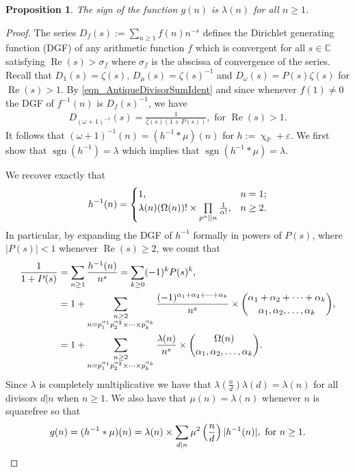 \documentclass[11pt,reqno,a4letter]{article}
\numberwithin{equation}{section}
\numberwithin{figure}{section}
\numberwithin{table}{section}
\newcommand{\cf}{\textit{cf.\ }}
\renewcommand{\chi}{\upchi}
\theoremstyle{plain}
\newtheorem{prop}[theorem]{Proposition}
\numberwithin{theorem}{section}
\theoremstyle{definition}
\renewcommand{\Re}{\operatorname{Re}}
\begin{document}
\begin{prop}
\label{prop_SignageDirInvsOfPosBddArithmeticFuncs_v1} 
The sign of the function $g(n)$ is $\lambda(n)$ for all $n \geq 1$. 
\end{prop} 
\begin{proof} 
The series $D_f(s) := \sum_{n \geq 1} f(n) n^{-s}$ defines the 
Dirichlet generating function (DGF) of any 
arithmetic function $f$ which is convergent for all $s \in \mathbb{C}$ satisfying 
$\Re(s) > \sigma_f$ where $\sigma_f$ is the abscissa of convergence of the series. 
Recall that $D_{\mathds{1}}(s) = \zeta(s)$, $D_{\mu}(s) = \zeta(s)^{-1}$ and 
$D_{\omega}(s) = P(s) \zeta(s)$ for $\Re(s) > 1$. 
By \eqref{eqn_AntiqueDivisorSumIdent} and since whenever $f(1) \neq 0$ 
the DGF of $f^{-1}(n)$ is $D_f(s)^{-1}$, we have 
\begin{align} 
\label{eqn_DGF_of_gInvn} 
D_{(\omega+1)^{-1}}(s) = \frac{1}{\zeta(s) (1+P(s))}, \text{ for } \Re(s) > 1. 
\end{align} 
It follows that $(\omega + 1)^{-1}(n) = (h^{-1} \ast \mu)(n)$ for 
$h := \chi_{\mathbb{P}} + \varepsilon$. 
We first show that $\operatorname{sgn}(h^{-1}) = \lambda$ which implies that 
$\operatorname{sgn}(h^{-1} \ast \mu) = \lambda$. 

We recover exactly that \cite[\cf \S 2]{FROBERG-1968} 
\begin{equation} 
\notag 
h^{-1}(n) = \begin{cases} 
     1, & n = 1; \\ 
     \lambda(n) (\Omega(n))! \times \prod\limits_{p^{\alpha} || n} \frac{1}{\alpha!}, & n \geq 2. 
     \end{cases}
\end{equation} 
In particular, by expanding the DGF of 
$h^{-1}$ formally in powers of $P(s)$, where $|P(s)| < 1$ whenever $\Re(s) \geq 2$, 
we count that 
\begin{align}
\notag
\frac{1}{1+P(s)} & = \sum_{n \geq 1} \frac{h^{-1}(n)}{n^s} = \sum_{k \geq 0} (-1)^k P(s)^k, \\ 
\notag
     & = 
     1 + \sum_{\substack{n \geq 2 \\ n =p_1^{\alpha_1}p_2^{\alpha_2} \times \cdots \times p_k^{\alpha_k}}} 
     \frac{(-1)^{\alpha_1+\alpha_2+\cdots+\alpha_k}}{n^s} \times 
     \binom{\alpha_1+\alpha_2+\cdots+\alpha_k}{\alpha_1,\alpha_2,\ldots,\alpha_k}, \\ 
\label{eqn_COmeganMultinomExp_as_DGFSeries_v2}
     & = 
     1 + \sum_{\substack{n \geq 2 \\ n =p_1^{\alpha_1}p_2^{\alpha_2} \times \cdots \times p_k^{\alpha_k}}} 
     \frac{\lambda(n)}{n^s} \times \binom{\Omega(n)}{\alpha_1,\alpha_2,\ldots,\alpha_k}. 
\end{align}
Since $\lambda$ is completely multiplicative we have that 
$\lambda\left(\frac{n}{d}\right) \lambda(d) = \lambda(n)$ for all divisors 
$d|n$ when $n \geq 1$. We also have that $\mu(n) = \lambda(n)$ 
whenever $n$ is squarefree so that
\[
g(n) = (h^{-1} \ast \mu)(n) = \lambda(n) \times 
     \sum_{d|n} \mu^2\left(\frac{n}{d}\right) |h^{-1}(n)|, \text{ for } n \geq 1. 
     \qedhere 
\]
\end{proof} 
\end{document}
